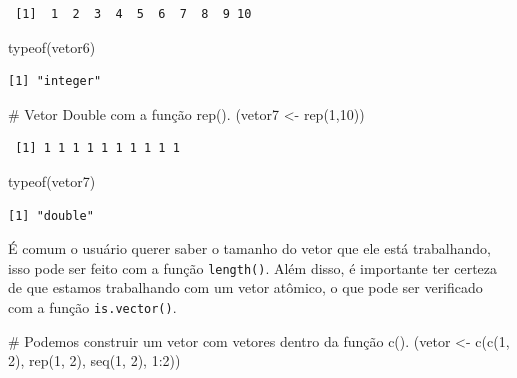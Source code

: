 \documentclass[
  letterpaper,
  DIV=11,
  numbers=noendperiod]{scrreprt}
\newenvironment{Shaded}{\begin{snugshade}}{\end{snugshade}}
\newcommand{\CommentTok}[1]{\textcolor[rgb]{0.37,0.37,0.37}{#1}}
\newcommand{\DecValTok}[1]{\textcolor[rgb]{0.68,0.00,0.00}{#1}}
\newcommand{\FunctionTok}[1]{\textcolor[rgb]{0.28,0.35,0.67}{#1}}
\newcommand{\NormalTok}[1]{\textcolor[rgb]{0.00,0.23,0.31}{#1}}
\newcommand{\OtherTok}[1]{\textcolor[rgb]{0.00,0.23,0.31}{#1}}
\newcommand{\SpecialCharTok}[1]{\textcolor[rgb]{0.37,0.37,0.37}{#1}}
\begin{document}
\begin{verbatim}
 [1]  1  2  3  4  5  6  7  8  9 10
\end{verbatim}

\begin{Shaded}
\begin{Highlighting}[]
\FunctionTok{typeof}\NormalTok{(vetor6)}
\end{Highlighting}
\end{Shaded}

\begin{verbatim}
[1] "integer"
\end{verbatim}

\begin{Shaded}
\begin{Highlighting}[]
\CommentTok{\# Vetor Double com a função rep(). }
\NormalTok{(vetor7 }\OtherTok{\textless{}{-}} \FunctionTok{rep}\NormalTok{(}\DecValTok{1}\NormalTok{,}\DecValTok{10}\NormalTok{))}
\end{Highlighting}
\end{Shaded}

\begin{verbatim}
 [1] 1 1 1 1 1 1 1 1 1 1
\end{verbatim}

\begin{Shaded}
\begin{Highlighting}[]
\FunctionTok{typeof}\NormalTok{(vetor7)}
\end{Highlighting}
\end{Shaded}

\begin{verbatim}
[1] "double"
\end{verbatim}

É comum o usuário querer saber o tamanho do vetor que ele está
trabalhando, isso pode ser feito com a função \texttt{length()}. Além
disso, é importante ter certeza de que estamos trabalhando com um vetor
atômico, o que pode ser verificado com a função \texttt{is.vector()}.

\begin{Shaded}
\begin{Highlighting}[]
\CommentTok{\# Podemos construir um vetor com vetores dentro da função c().}
\NormalTok{(vetor }\OtherTok{\textless{}{-}} \FunctionTok{c}\NormalTok{(}\FunctionTok{c}\NormalTok{(}\DecValTok{1}\NormalTok{, }\DecValTok{2}\NormalTok{), }\FunctionTok{rep}\NormalTok{(}\DecValTok{1}\NormalTok{, }\DecValTok{2}\NormalTok{), }\FunctionTok{seq}\NormalTok{(}\DecValTok{1}\NormalTok{, }\DecValTok{2}\NormalTok{), }\DecValTok{1}\SpecialCharTok{:}\DecValTok{2}\NormalTok{))}
\end{Highlighting}
\end{Shaded}
\end{document}
